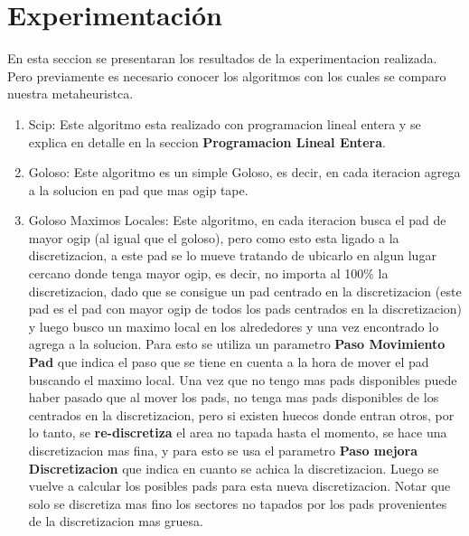 \newpage
\section{Experimentación}\label{sec:experimentacion}

En esta seccion se presentaran los resultados de la experimentacion realizada. Pero previamente es necesario conocer los algoritmos con los cuales se comparo nuestra metaheuristca.

\begin{enumerate}
\item Scip: Este algoritmo esta realizado con programacion lineal entera y se explica en detalle en la seccion \textbf{Programacion Lineal Entera}.
\item Goloso: Este algoritmo es un simple Goloso, es decir, en cada iteracion agrega a la solucion en pad que mas ogip tape.
\item Goloso Maximos Locales: Este algoritmo, en cada iteracion busca el pad de mayor ogip (al igual que el goloso), pero como esto esta ligado a la discretizacion, a este pad se lo mueve tratando de ubicarlo en algun lugar cercano donde tenga mayor ogip, es decir, no importa al 100\% la discretizacion, dado que se consigue un pad centrado en la discretizacion (este pad es el pad con mayor ogip de todos los pads centrados en la discretizacion) y luego busco un maximo local en los alrededores y una vez encontrado lo agrega a la solucion.
Para esto se utiliza un parametro \textbf{Paso Movimiento Pad} que indica el paso que se tiene en cuenta a la hora de mover el pad buscando el maximo local. 
Una vez que no tengo mas pads disponibles puede haber pasado que al mover los pads, no tenga mas pads disponibles de los centrados en la discretizacion, pero si existen huecos donde entran otros, por lo tanto, se \textbf{re-discretiza} el area no tapada hasta el momento, se hace una discretizacion mas fina, y para esto se usa el parametro \textbf{Paso mejora Discretizacion} que indica en cuanto se achica la discretizacion. Luego se vuelve a calcular los posibles pads para esta nueva discretizacion. Notar que solo se discretiza mas fino los sectores no tapados por los pads provenientes de la discretizacion mas gruesa.
\end{enumerate}